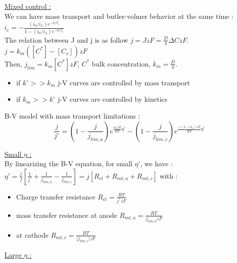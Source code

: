 \documentclass[../main.tex]{subfiles}
\begin{document}
\quad \underline{Mixed control :}\\
We can have mass transport and butler-volmer behavior at the same time : $i_c = -\frac{(i_0/i_L) e^{-\eta/\beta_c}}{1-(i_0/i_L) e^{-\eta/\beta_c}}$\\
The relation between J and j is as follow $j = J zF = \frac{D}{\delta} \Delta C z F$.\\
$j = k_m ([C^*]-[C_s]) zF$\\
Then, $j_{lim} = k_m [C^*] zF$, $C^*$ bulk concentration, $k_m = \frac{D}{\delta}$.\\
\begin{itemize}
    \item if $k^\circ>> k_m$ j-V curves are controlled by mass transport
    \item if $k_m>>k^\circ$ j-V curves are controlled by kinetics
\end{itemize}

B-V model with mass transport limitations : \begin{equation}
    \frac{j}{j^\circ} = (1-\frac{j}{j_{lim,a}}) e^{\frac{\alpha_a zF}{RT} \eta'} - (1-\frac{j}{j_{lim,c}}) e^{\frac{-(1-\alpha_a) zF}{RT} \eta'}
\end{equation}

\quad \underline{Small $\eta$ :}\\

By linearizing the B-V equation, for small $\eta'$, we have : $\eta' = \frac{j}{f} [\frac{1}{j^\circ} + \frac{1}{j_{lim,a}} - \frac{1}{j_{lim,c}}] = j [R_{ct} + R_{mt,a} + R_{mt,c}]$ with : \begin{itemize}
    \item Charge transfer resistance $R_{ct} = \frac{RT}{j^\circ z F}$
    \item mass transfer resistance at anode $R_{mt,a} = \frac{RT}{j_{lim,a} zF}$
    \item at cathode $R_{mt,c} = \frac{RT}{\lvert j_{lim,c}\rvert zF}$
\end{itemize}

\quad \underline{Large $\eta$ :}\\
\end{document}
